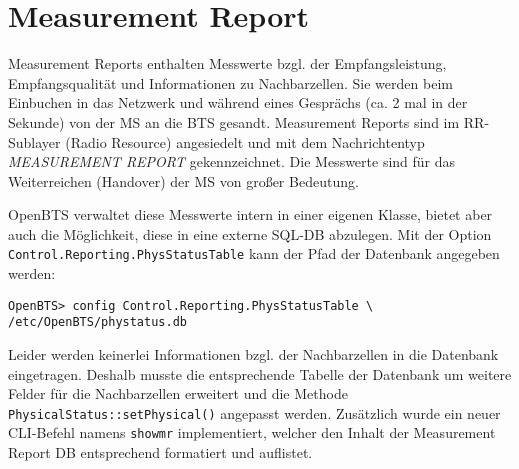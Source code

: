 \section{Measurement Report}
Measurement Reports enthalten Messwerte bzgl. der Empfangsleistung, Empfangsqualität und Informationen zu Nachbarzellen. Sie werden beim Einbuchen in das Netzwerk und während eines Gesprächs (ca. 2 mal in der Sekunde) von der MS an die BTS gesandt. Measurement Reports sind im RR-Sublayer (Radio Resource) angesiedelt und mit dem Nachrichtentyp \textit{MEASUREMENT REPORT} gekennzeichnet. Die Messwerte sind für das Weiterreichen (Handover) der MS von großer Bedeutung.

OpenBTS verwaltet diese Messwerte intern in einer eigenen Klasse, bietet aber auch die Möglichkeit, diese in eine externe SQL-DB abzulegen. Mit der Option \verb|Control.Reporting.PhysStatusTable| kann der Pfad der Datenbank angegeben werden:
\begin{verbatim}
OpenBTS> config Control.Reporting.PhysStatusTable \
/etc/OpenBTS/phystatus.db
\end{verbatim}

Leider werden keinerlei Informationen bzgl. der Nachbarzellen in die Datenbank eingetragen. Deshalb musste die entsprechende Tabelle der Datenbank um weitere Felder für die Nachbarzellen erweitert und die Methode \verb|PhysicalStatus::setPhysical()| angepasst werden.
Zusätzlich wurde ein neuer CLI-Befehl namens \verb|showmr| implementiert, welcher den Inhalt der Measurement Report DB entsprechend formatiert und auflistet.


